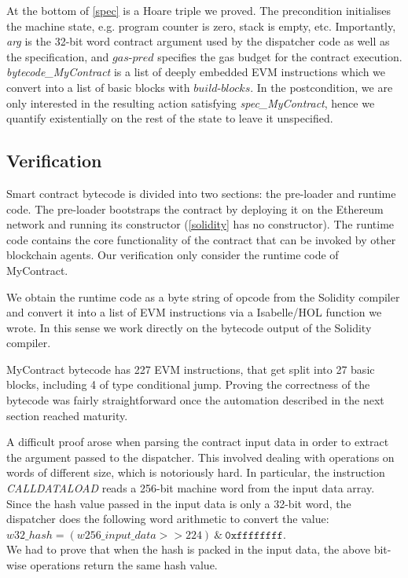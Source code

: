\documentclass[sigplan,10pt,review]{acmart}\settopmatter{printfolios=true,printccs=false,printacmref=false}
\newcommand{\gaspred}{\mathit{gas\mbox{-}pred}}
\newcommand{\bblocks}{\mathit{build\mbox{-}blocks}}
\begin{document}
At the bottom of \autoref{spec} is a Hoare triple we proved.
The precondition initialises the machine state, e.g. program counter is zero,
stack is empty, etc. Importantly, \textit{arg} is the 32-bit word contract
argument used by the dispatcher code as well as the specification,
and $\gaspred$ specifies the gas budget for the contract execution.
\textit{bytecode\_MyContract} is a list of deeply embedded EVM
instructions which we convert into a list of basic blocks with $\bblocks$.
In the postcondition, we are only interested in the resulting action
satisfying \textit{spec\_MyContract}, hence we quantify existentially
on the rest of the state to leave it unspecified.

\subsection{Verification}


Smart contract bytecode is divided into two sections: the pre-loader and
runtime code.
The pre-loader bootstraps the contract by deploying it on the
Ethereum network and running its constructor (\autoref{solidity}
has no constructor).
The runtime code contains the core functionality of the contract
that can be invoked by other blockchain agents.
Our verification only consider the runtime code of MyContract.

We obtain the runtime code as a byte string of opcode from the Solidity
compiler and convert it into a list of EVM instructions via a
Isabelle/HOL function we wrote.
In this sense we work directly on the bytecode output of
the Solidity compiler.

MyContract bytecode has 227 EVM instructions, that get split into 27 basic
blocks, including 4 of type conditional jump.
Proving the correctness of the bytecode was fairly straightforward
once the automation described in the next section reached maturity.

A difficult proof arose when parsing the contract input data
in order to extract the argument passed to the dispatcher.
This involved dealing with operations on words of different size,
which is notoriously hard.
In particular, the instruction \textit{CALLDATALOAD} reads a
256-bit machine word from the input data array.
Since the hash value passed in the input data is only a 32-bit word,
the dispatcher does the following word arithmetic to convert the value:\\
$w32\_hash = (w256\_input\_data >> 224)\ \&\ \mathtt{0xffffffff}$.\\
We had to prove that when the hash is packed in the input data,
the above bit-wise operations return the same hash value.
\end{document}
